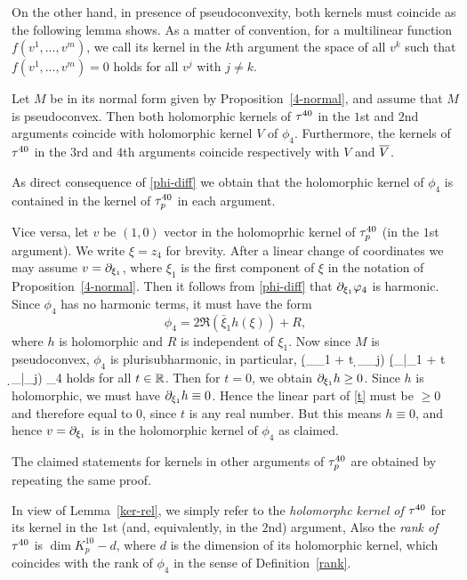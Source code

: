 \documentclass[12pt]{amsart}
\begin{document}
On the other hand, in presence of pseudoconvexity,
both kernels must coincide as the following lemma shows.
As a matter of convention, for a multilinear function 
$f(v^1, \ldots, v^m)$, we call its kernel in the $k$th argument
the space of all $v^k$ such that $f(v^1, \ldots, v^m)=0$ holds
for all $v^j$ with $j\ne k$.

\bl{}
	Let $M$ be in its normal form given by Proposition~\ref{4-normal},
	and
	assume that $M$ is pseudoconvex.
	Then both holomorphic kernels of $\tau^{40}$ in the $1$st and $2$nd arguments coincide with holomorphic kernel 
	$V$ of $\phi_4$.
	Furthermore,
	the kernels of $\tau^{40}$ in the $3$rd and $4$th arguments
	 coincide respectively with $V$ and $\overline{V}$.
\el


\bpf
As direct consequence of \eqref{phi-diff} we obtain
that the holomorphic kernel of $\phi_4$ is contained
in the kernel of $\tau^{40}_p$ in each argument.

Vice versa, let $v$ be $(1,0)$ vector in the holomoprhic 
kernel of $\tau^{40}_p$ (in the $1$st argument).
We write $\xi=z_4$ for brevity.
After a linear change of coordinates we may assume 
$v=\partial_{\xi_1}$, where $\xi_1$ is the first component of $\xi$
in the notation of Proposition~\ref{4-normal}.
Then it follows from \eqref{phi-diff} that
$\partial_{\xi_1} \varphi_4$ is harmonic.
Since $\phi_4$ has no harmonic terms, it must have the form
$$
	\phi_4 = 2\Re (\bar\xi_1 h(\xi)) + R,
$$
where $h$ is holomorphic and $R$ is independent of $\xi_1$.
Now since $M$ is pseudoconvex, $\phi_4$ is plurisubharmonic,
in particular,
\beq{}
	(\d_{\xi_1} + t \d_{\xi_j}) (\d_{\bar\xi_1} + t \d_{\bar\xi_j}) 
	\phi_4 
\eeq
holds for all $t\in {\mathbb{R}}$.
Then for $t=0$, we obtain $\partial_{\xi_1}h\ge 0$.
Since $h$ is holomorphic, we must have $\partial_{\xi_1}h \equiv 0$.
Hence the linear part of \eqref{t} must be $\ge 0$
and therefore equal to $0$, since $t$ is any real number.
But this means $h\equiv 0$, and hence $v=\partial_{\xi_1}$ is in the 
holomorphic kernel of $\phi_4$ as claimed.

The claimed statements for kernels in other arguments of $\tau^{40}_p$
are obtained by 
repeating the same proof. 
\epf

In view of Lemma~\ref{ker-rel},
we simply refer to the {\em holomorphc kernel of $\tau^{40}$}
for its kernel in the $1$st (and, equivalently, in the $2$nd) argument,
Also the {\em rank of $\tau^{40}$} is 
$\dim K^{10}_p - d$,
where $d$ is the dimension of its holomorphic kernel,
which coincides with the rank of $\phi_4$
in the sense of Definition~\ref{rank}.
\end{document}
